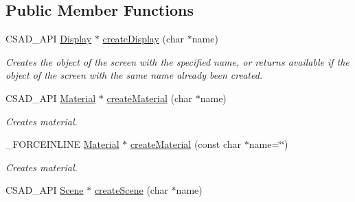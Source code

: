 \subsection*{Public Member Functions}
\begin{DoxyCompactItemize}
\item 
\hypertarget{classcsad_1_1_graph_a53bc5a6d553e4381bc642719322a6cb5}{C\-S\-A\-D\-\_\-\-A\-P\-I \hyperlink{classcsad_1_1_display}{Display} $\ast$ \hyperlink{classcsad_1_1_graph_a53bc5a6d553e4381bc642719322a6cb5}{create\-Display} (char $\ast$name)}\label{classcsad_1_1_graph_a53bc5a6d553e4381bc642719322a6cb5}

\begin{DoxyCompactList}\small\item\em Creates the object of the screen with the specified name, or returns available if the object of the screen with the same name already been created. \end{DoxyCompactList}\item 
\hypertarget{classcsad_1_1_graph_af95625ac8e2b5327901f632554c985a3}{C\-S\-A\-D\-\_\-\-A\-P\-I \hyperlink{classcsad_1_1_material}{Material} $\ast$ \hyperlink{classcsad_1_1_graph_af95625ac8e2b5327901f632554c985a3}{create\-Material} (char $\ast$name)}\label{classcsad_1_1_graph_af95625ac8e2b5327901f632554c985a3}

\begin{DoxyCompactList}\small\item\em Creates material. \end{DoxyCompactList}\item 
\hypertarget{classcsad_1_1_graph_a074f1bbd06340c3d880bd4912d4a3e08}{\-\_\-\-F\-O\-R\-C\-E\-I\-N\-L\-I\-N\-E \hyperlink{classcsad_1_1_material}{Material} $\ast$ \hyperlink{classcsad_1_1_graph_a074f1bbd06340c3d880bd4912d4a3e08}{create\-Material} (const char $\ast$name=\char`\"{}\char`\"{})}\label{classcsad_1_1_graph_a074f1bbd06340c3d880bd4912d4a3e08}

\begin{DoxyCompactList}\small\item\em Creates material. \end{DoxyCompactList}\item 
\hypertarget{classcsad_1_1_graph_a3192d7f765642798d9e1bc16e7438b4a}{C\-S\-A\-D\-\_\-\-A\-P\-I \hyperlink{classcsad_1_1_scene}{Scene} $\ast$ \hyperlink{classcsad_1_1_graph_a3192d7f765642798d9e1bc16e7438b4a}{create\-Scene} (char $\ast$name)}\label{classcsad_1_1_graph_a3192d7f765642798d9e1bc16e7438b4a}


\end{DoxyCompactItemize}
